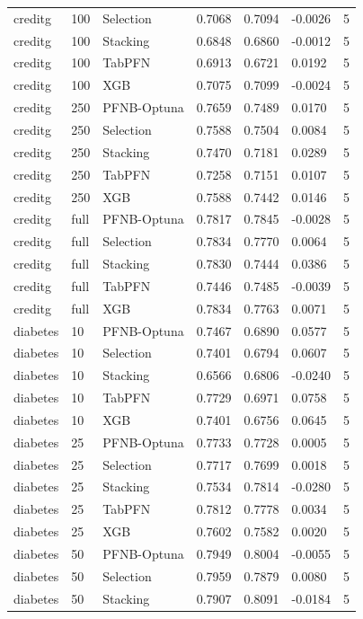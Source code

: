 \begin{tabular}{llllllr}
creditg & 100 & Selection & 0.7068 & 0.7094 & -0.0026 & 5 \\
creditg & 100 & Stacking & 0.6848 & 0.6860 & -0.0012 & 5 \\
creditg & 100 & TabPFN & 0.6913 & 0.6721 & 0.0192 & 5 \\
creditg & 100 & XGB & 0.7075 & 0.7099 & -0.0024 & 5 \\
creditg & 250 & PFNB-Optuna & 0.7659 & 0.7489 & 0.0170 & 5 \\
creditg & 250 & Selection & 0.7588 & 0.7504 & 0.0084 & 5 \\
creditg & 250 & Stacking & 0.7470 & 0.7181 & 0.0289 & 5 \\
creditg & 250 & TabPFN & 0.7258 & 0.7151 & 0.0107 & 5 \\
creditg & 250 & XGB & 0.7588 & 0.7442 & 0.0146 & 5 \\
creditg & full & PFNB-Optuna & 0.7817 & 0.7845 & -0.0028 & 5 \\
creditg & full & Selection & 0.7834 & 0.7770 & 0.0064 & 5 \\
creditg & full & Stacking & 0.7830 & 0.7444 & 0.0386 & 5 \\
creditg & full & TabPFN & 0.7446 & 0.7485 & -0.0039 & 5 \\
creditg & full & XGB & 0.7834 & 0.7763 & 0.0071 & 5 \\
diabetes & 10 & PFNB-Optuna & 0.7467 & 0.6890 & 0.0577 & 5 \\
diabetes & 10 & Selection & 0.7401 & 0.6794 & 0.0607 & 5 \\
diabetes & 10 & Stacking & 0.6566 & 0.6806 & -0.0240 & 5 \\
diabetes & 10 & TabPFN & 0.7729 & 0.6971 & 0.0758 & 5 \\
diabetes & 10 & XGB & 0.7401 & 0.6756 & 0.0645 & 5 \\
diabetes & 25 & PFNB-Optuna & 0.7733 & 0.7728 & 0.0005 & 5 \\
diabetes & 25 & Selection & 0.7717 & 0.7699 & 0.0018 & 5 \\
diabetes & 25 & Stacking & 0.7534 & 0.7814 & -0.0280 & 5 \\
diabetes & 25 & TabPFN & 0.7812 & 0.7778 & 0.0034 & 5 \\
diabetes & 25 & XGB & 0.7602 & 0.7582 & 0.0020 & 5 \\
diabetes & 50 & PFNB-Optuna & 0.7949 & 0.8004 & -0.0055 & 5 \\
diabetes & 50 & Selection & 0.7959 & 0.7879 & 0.0080 & 5 \\
diabetes & 50 & Stacking & 0.7907 & 0.8091 & -0.0184 & 5 \\

\end{tabular}
